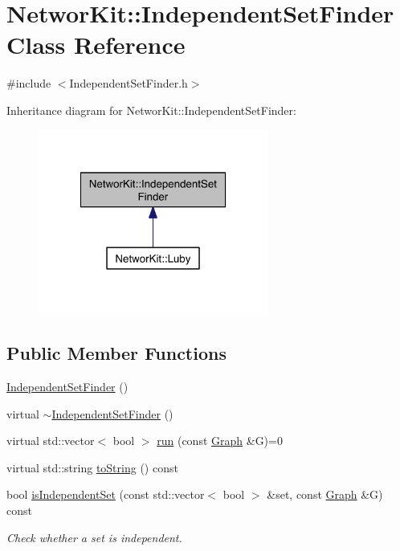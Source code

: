 \hypertarget{class_networ_kit_1_1_independent_set_finder}{\section{Networ\-Kit\-:\-:Independent\-Set\-Finder Class Reference}
\label{class_networ_kit_1_1_independent_set_finder}
}


{\ttfamily \#include $<$Independent\-Set\-Finder.\-h$>$}



Inheritance diagram for Networ\-Kit\-:\-:Independent\-Set\-Finder\-:\nopagebreak
\begin{figure}[H]
\begin{center}
\leavevmode
\includegraphics[width=214pt]{class_networ_kit_1_1_independent_set_finder__inherit__graph}
\end{center}
\end{figure}
\subsection*{Public Member Functions}
\begin{DoxyCompactItemize}
\item 
\hyperlink{class_networ_kit_1_1_independent_set_finder_aa513fdd0bd57631f5a5e1ab65e3b0f21}{Independent\-Set\-Finder} ()
\item 
virtual \hyperlink{class_networ_kit_1_1_independent_set_finder_a8fe711462c886c3ddaf95dbf27fd33a0}{$\sim$\-Independent\-Set\-Finder} ()
\item 
virtual std\-::vector$<$ bool $>$ \hyperlink{class_networ_kit_1_1_independent_set_finder_a85b7d98af867103897bd672c54a70845}{run} (const \hyperlink{class_networ_kit_1_1_graph}{Graph} \&G)=0
\item 
virtual std\-::string \hyperlink{class_networ_kit_1_1_independent_set_finder_a7a44fbc1e1a438a162f2f915ff845328}{to\-String} () const 
\item 
bool \hyperlink{class_networ_kit_1_1_independent_set_finder_a6a266413f1afa093ca64889b1846c74d}{is\-Independent\-Set} (const std\-::vector$<$ bool $>$ \&set, const \hyperlink{class_networ_kit_1_1_graph}{Graph} \&G) const 
\begin{DoxyCompactList}\small\item\em Check whether a set is independent. \end{DoxyCompactList}\end{DoxyCompactItemize}



